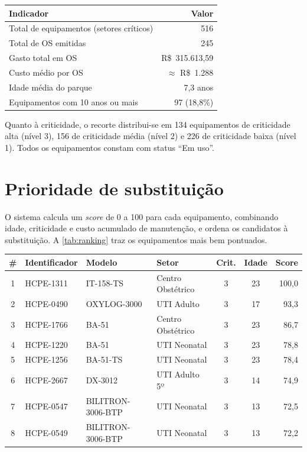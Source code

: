 \begin{table}[H]
    \centering
    \begin{tabular}{lr}
        \hline
        \textbf{Indicador} & \textbf{Valor} \\
        \hline
        Total de equipamentos (setores críticos) & 516 \\
        Total de OS emitidas & 245 \\
        Gasto total em OS & R\$~315.613,59 \\
        Custo médio por OS & $\approx$ R\$~1.288 \\
        Idade média do parque & 7,3 anos \\
        Equipamentos com 10 anos ou mais & 97 (18,8\%) \\
        \hline
    \end{tabular}
\end{table}

Quanto à criticidade, o recorte distribui-se em 134 equipamentos de criticidade
alta (nível 3), 156 de criticidade média (nível 2) e 226 de criticidade baixa
(nível 1). Todos os equipamentos constam com status ``Em uso''.

\section{Prioridade de substituição}

O sistema calcula um \textit{score} de 0 a 100 para cada equipamento, combinando
idade, criticidade e custo acumulado de manutenção, e ordena os candidatos à
substituição. A \ref{tab:ranking} traz os equipamentos mais bem pontuados.

\begin{table}[H]
    \centering
    \begin{tabular}{clllccr}
        \hline
        \textbf{\#} & \textbf{Identificador} & \textbf{Modelo} & \textbf{Setor} & \textbf{Crit.} & \textbf{Idade} & \textbf{Score} \\
        \hline
        1 & HCPE-1311 & IT-158-TS & Centro Obstétrico & 3 & 23 & 100,0 \\
        2 & HCPE-0490 & OXYLOG-3000 & UTI Adulto & 3 & 17 & 93,3 \\
        3 & HCPE-1766 & BA-51 & Centro Obstétrico & 3 & 23 & 86,7 \\
        4 & HCPE-1220 & BA-51 & UTI Neonatal & 3 & 23 & 78,8 \\
        5 & HCPE-1256 & BA-51-TS & UTI Neonatal & 3 & 23 & 78,4 \\
        6 & HCPE-2667 & DX-3012 & UTI Adulto 5º & 3 & 14 & 74,9 \\
        7 & HCPE-0547 & BILITRON-3006-BTP & UTI Neonatal & 3 & 13 & 72,5 \\
        8 & HCPE-0549 & BILITRON-3006-BTP & UTI Neonatal & 3 & 13 & 72,2 \\
        \hline
    \end{tabular}
\end{table}

